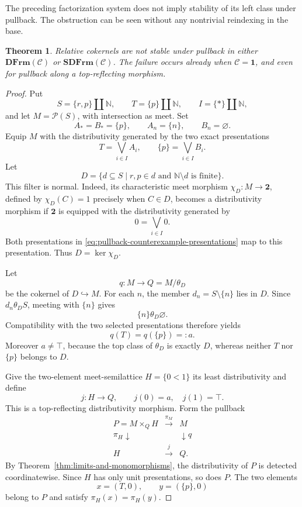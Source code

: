 \documentclass[12pt,oneside,reqno]{amsart}
\newtheorem{theorem}{Theorem}[section]
\theoremstyle{definition}
\theoremstyle{remark}
\newcommand{\C}{\mathcal C}
\newcommand{\DFrm}{\mathbf{DFrm}}
\newcommand{\SDFrm}{\mathbf{SDFrm}}
\begin{document}
The preceding factorization system does not imply stability of its left
class under pullback.  The obstruction can be seen without any
nontrivial reindexing in the base.

\begin{theorem}\label{thm:cokernels-not-pullback-stable}
Relative cokernels are not stable under pullback in either
\(\DFrm(\C)\) or \(\SDFrm(\C)\).  The failure occurs already when
\(\C=\mathbf1\), and even for pullback along a top-reflecting morphism.
\end{theorem}

\begin{proof}
Put
\[
 S=\{r,p\}\amalg\mathbb N,\qquad
 T=\{p\}\amalg\mathbb N,\qquad
 I=\{*\}\amalg\mathbb N,
\]
and let \(M=\mathcal P(S)\), with intersection as meet.  Set
\[
 A_* = B_*=\{p\},\qquad A_n=\{n\},\qquad B_n=\varnothing .
\]
Equip \(M\) with the distributivity generated by the two exact
presentations
\begin{equation}\label{eq:pullback-counterexample-presentations}
                    T=\bigvee_{i\in I}A_i,
             \qquad \{p\}=\bigvee_{i\in I}B_i .
\end{equation}
Let
\[
 D=\{d\subseteq S\mid r,p\in d\text{ and }
                     \mathbb N\setminus d\text{ is finite}\}.
\]
This filter is normal.  Indeed, its characteristic meet morphism
\(\chi_D:M\to\mathbf2\), defined by \(\chi_D(C)=1\) precisely when
\(C\in D\), becomes a distributivity morphism if \(\mathbf2\) is
equipped with the distributivity generated by
\[
                          0=\bigvee_{i\in I}0.
\]
Both presentations in
\eqref{eq:pullback-counterexample-presentations} map to this
presentation.  Thus \(D=\ker\chi_D\).

Let
\[
                    q:M\longrightarrow Q=M/\theta_D
\]
be the cokernel of \(D\hookrightarrow M\).  For each \(n\), the member
\(d_n=S\setminus\{n\}\) lies in \(D\).  Since
\(d_n\mathrel{\theta_D}S\), meeting with \(\{n\}\) gives
\[
                     \{n\}\mathrel{\theta_D}\varnothing .
\]
Compatibility with the two selected presentations therefore yields
\[
                     q(T)=q(\{p\})=:a.
\]
Moreover \(a\neq\top\), because the top class of \(\theta_D\) is
exactly \(D\), whereas neither \(T\) nor \(\{p\}\) belongs to \(D\).

Give the two-element meet-semilattice \(H=\{0<1\}\) its least
distributivity and define
\[
                   j:H\longrightarrow Q,\qquad
                   j(0)=a,\quad j(1)=\top .
\]
This is a top-reflecting distributivity morphism.  Form the pullback
\[
\begin{array}{ccc}
P=M\times_QH&\xrightarrow{\pi_M}&M\\
{\scriptstyle\pi_H}\downarrow&&\downarrow{\scriptstyle q}\\
H&\xrightarrow{j}&Q .
\end{array}
\]
By Theorem~\ref{thm:limits-and-monomorphisms}, the distributivity of
\(P\) is detected coordinatewise.  Since \(H\) has only unit
presentations, so does \(P\).  The two elements
\[
                         x=(T,0),\qquad y=(\{p\},0)
\]
belong to \(P\) and satisfy \(\pi_H(x)=\pi_H(y)\).


\end{proof}
\end{document}
